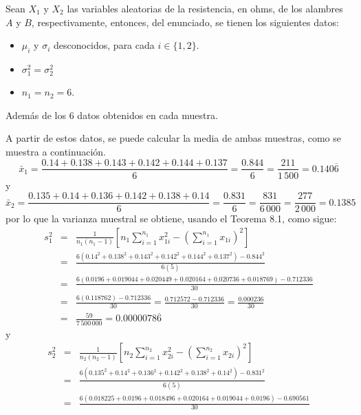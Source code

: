 \begin{solucion}
 Sean $X_1$ y $X_2$ las variables aleatorias de la resistencia, en ohms, de los alambres $A$ y $B$, respectivamente, entonces, del enunciado, se tienen los siguientes datos:
 \begin{itemize}
  \item $\mu_i$ y $\sigma_i$ desconocidos, para cada $i \in \{ 1, 2 \}$.
  \item $\sigma_1^2 = \sigma_2^2$
  \item $n_1 = n_2 = 6$.
 \end{itemize}
 Adem\'as de los $6$ datos obtenidos en cada muestra.
 \par 
 A partir de estos datos, se puede calcular la media de ambas muestras, como se muestra a continuaci\'on.
 \begin{equation*}
  \bar{x}_1 = \frac{0.14 + 0.138 + 0.143 + 0.142 + 0.144 + 0.137}{6} = \frac{0.844}{6} = \frac{211}{1\,500} = 0.140\overline{6}
 \end{equation*}
 y
 \begin{equation*}
  \bar{x}_2 = \frac{0.135 + 0.14 + 0.136 + 0.142 + 0.138 + 0.14}{6} = \frac{0.831}{6} = \frac{831}{6\,000} = \frac{277}{2\,000} = 0.1385
 \end{equation*}
 por lo que la varianza muestral se obtiene, usando el Teorema 8.1, como sigue:
 \begin{eqnarray*}
  s_1^2 & = & \frac{1}{n_1(n_1-1)} \left[ n_1 \sum_{i=1}^{n_1} x_{1i}^2 - \left( \sum_{i=1}^{n_1} x_{1i} \right)^2 \right] \\
  & = & \frac{6\left( 0.14^2 + 0.138^2 + 0.143^2 + 0.142^2 + 0.144^2 + 0.137^2 \right) - 0.844^2 }{6(5)} \\
  & = & \frac{6( 0.0196 + 0.019044 + 0.020449 + 0.020164 + 0.020736 + 0.018769) - 0.712336}{30} \\
  & = & \frac{6(0.118762) - 0.712336}{30} = \frac{0.712572 - 0.712336}{30} = \frac{0.000236}{30} \\
  & = & \frac{59}{7\,500\,000} = 0.0000078\overline{6}
 \end{eqnarray*}
 y
 \begin{eqnarray*}
  s_2^2 & = & \frac{1}{n_2(n_2-1)} \left[ n_2 \sum_{i=1}^{n_2} x_{2i}^2 - \left( \sum_{i=1}^{n_2} x_{2i} \right)^2 \right] \\
  & = & \frac{6\left( 0.135^2 + 0.14^2 + 0.136^2 + 0.142^2 + 0.138^2 + 0.14^2 \right) - 0.831^2}{6(5)} \\
  & = & \frac{6(0.018225 + 0.0196 + 0.018496 + 0.020164 + 0.019044 + 0.0196) - 0.690561}{30} \\

\end{eqnarray*}
\end{solucion}
